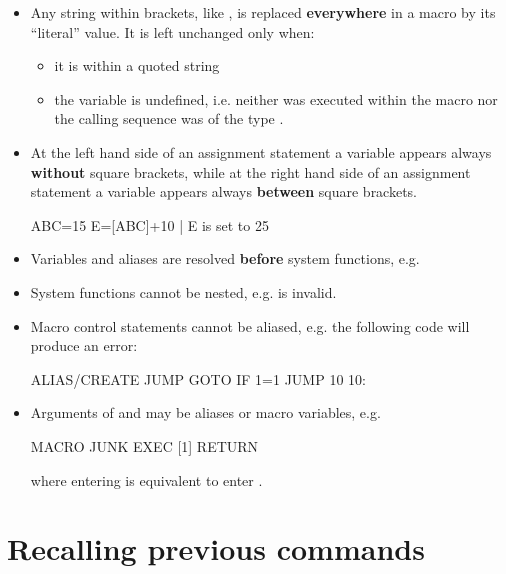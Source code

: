 \begin{itemize}
\item
Any string within brackets, like \Lit{[variable]},
is replaced {\bf everywhere} in a macro by its ``literal'' value. 
It is left unchanged only when:
\begin{itemize}
\item
it is within a quoted string
\item
the variable is undefined,
i.e. neither  was executed within the
macro nor the calling sequence was of the type .
\end{itemize}
\item
At the left hand side of an assignment statement a variable appears always
{\bf without} square brackets, while at the right hand side of an assignment 
statement a variable appears always
{\bf between} square brackets.
\begin{XMP}
ABC=15
E=[ABC]+10       | E is set to 25
\end{XMP}
\item
Variables and aliases are resolved {\bf before} system functions, e.g.
\item
System functions cannot be nested, e.g. 
is invalid.
\item
Macro control statements cannot be aliased, e.g. the following code will produce
an error:
\begin{XMP}
ALIAS/CREATE JUMP GOTO
IF 1=1 JUMP 10
10:
\end{XMP}
\item
Arguments of  and  may be aliases or macro variables, e.g.
\begin{XMP}
MACRO JUNK
  EXEC [1]
RETURN
\end{XMP}
where entering  is equivalent to enter .
\end{itemize}
%
%
\section{Recalling previous commands}


